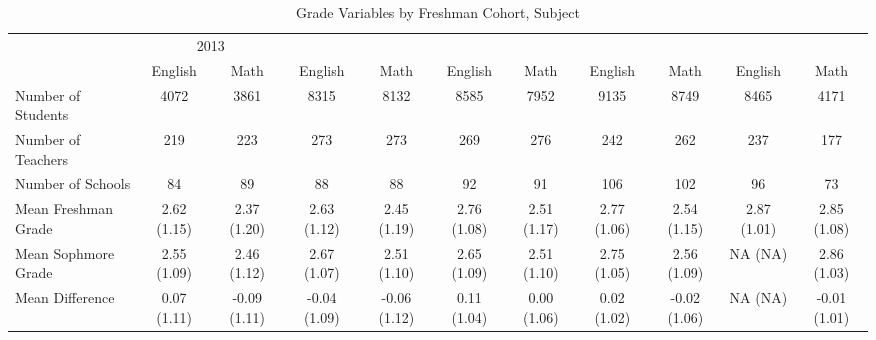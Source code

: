 \begin{table}

\caption{\label{tab:table_freq}Grade Variables by Freshman Cohort, Subject\label{tab:table_freq}}
\centering
\begin{tabular}[t]{lcccccccccc}
\toprule
\multicolumn{1}{c}{ } & \multicolumn{2}{c}{2013} \\
\cmidrule(l{3pt}r{3pt}){2-3}
  & English & Math & English & Math & English & Math & English & Math & English & Math\\
\midrule
Number of Students & 4072 & 3861 & 8315 & 8132 & 8585 & 7952 & 9135 & 8749 & 8465 & 4171\\
Number of Teachers & 219 & 223 & 273 & 273 & 269 & 276 & 242 & 262 & 237 & 177\\
Number of Schools & 84 & 89 & 88 & 88 & 92 & 91 & 106 & 102 & 96 & 73\\
\addlinespace
Mean Freshman Grade & 2.62 (1.15) & 2.37 (1.20) & 2.63 (1.12) & 2.45 (1.19) & 2.76 (1.08) & 2.51 (1.17) & 2.77 (1.06) & 2.54 (1.15) & 2.87 (1.01) & 2.85 (1.08)\\
Mean Sophmore Grade & 2.55 (1.09) & 2.46 (1.12) & 2.67 (1.07) & 2.51 (1.10) & 2.65 (1.09) & 2.51 (1.10) & 2.75 (1.05) & 2.56 (1.09) & NA (NA) & 2.86 (1.03)\\
Mean Difference & 0.07 (1.11) & -0.09 (1.11) & -0.04 (1.09) & -0.06 (1.12) & 0.11 (1.04) & 0.00 (1.06) & 0.02 (1.02) & -0.02 (1.06) & NA (NA) & -0.01 (1.01)\\
\bottomrule
\end{tabular}
\end{table}
